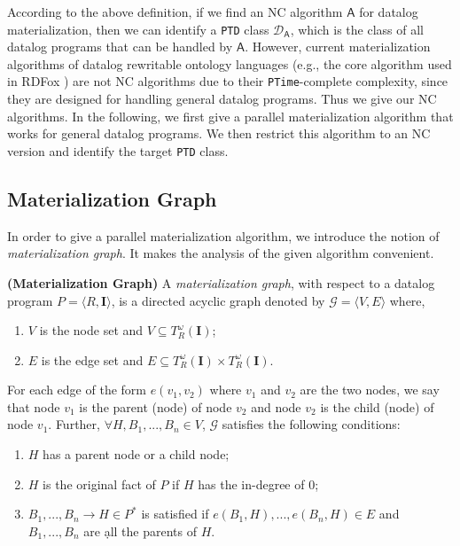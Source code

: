 \documentclass[final,1p,times]{elsarticle}
\begin{document}
According to the above definition, if we find an NC algorithm $\mathsf{A}$
for datalog materialization, then we can identify a \texttt{PTD} class $\mathcal{D}_{\mathsf{A}}$,
which is the class of all datalog programs that can be handled by $\mathsf{A}$.
However, current materialization algorithms of datalog rewritable ontology languages
(e.g., the core algorithm used in RDFox \cite{MotikNPHO14}) are not NC algorithms
due to their \texttt{PTime}-complete complexity, since they are designed for handling general datalog programs.
Thus we give our NC algorithms.
In the following, we first give a parallel materialization algorithm that works for
general datalog programs. We then restrict this algorithm to an NC version
and identify the target \texttt{PTD} class.


\subsection{Materialization Graph}

In order to give a parallel materialization algorithm,
we introduce the notion of \emph{materialization graph}.
It makes the analysis of the given algorithm convenient.

\begin{definition}
\textbf{(Materialization Graph)}\label{def:mg}
A \emph{materialization graph}, with respect to
a datalog program $P=\langle R, \textbf{I}\rangle$, is a directed acyclic graph
denoted by $\mathcal{G}=\langle V, E\rangle$ where,
\begin{enumerate}[leftmargin=4ex,label=$\bullet$]
  \item $V$ is the node set and $V\subseteq T_R^{\omega}(\textbf{I})$;
  \item $E$ is the edge set and $E\subseteq T_R^{\omega}(\textbf{I})\times T_R^{\omega}(\textbf{I})$.
\end{enumerate}
For each edge of the form $e(v_1, v_2)$ where $v_1$ and $v_2$ are the two nodes,
we say that node $v_1$ is the parent (node) of node $v_2$ and node $v_2$ is the child (node)
of node $v_1$. Further, $\forall H,B_1,...,B_n\in V$, $\mathcal{G}$ satisfies the following conditions:
\begin{enumerate}[leftmargin=4ex,label=$\bullet$]
  \item $H$ has a parent node or a child node;
  \item $H$ is the original fact of $P$ if $H$ has the in-degree of $0$;
  \item $B_1,...,B_n\rightarrow H\in P^*$ is satisfied if $e(B_1, H),...,e(B_n, H)\in E$ and
  $B_1,...,B_n$ are \d{all} the parents of $H$.
\end{enumerate}
\end{definition}
\end{document}

